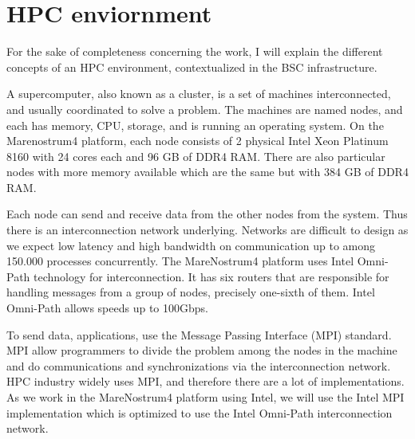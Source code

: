 \section{HPC enviornment}

For the sake of completeness concerning the work, I will explain the different concepts of an HPC environment, contextualized in the BSC infrastructure.

A supercomputer, also known as a cluster, is a set of machines interconnected, and usually coordinated to solve a problem. The machines are named nodes, and each has memory, CPU, storage, and is running an operating system.  On the Marenostrum4 platform, each node consists of 2 physical Intel Xeon Platinum 8160 with 24 cores each and 96 GB of DDR4 RAM. There are also particular nodes with more memory available which are the same but with 384 GB of DDR4 RAM.
 
Each node can send and receive data from the other nodes from the system. Thus there is an interconnection network underlying. Networks are difficult to design as we expect low latency and high bandwidth on communication up to among 150.000 processes concurrently. The MareNostrum4 platform uses Intel Omni-Path technology for interconnection. It has six routers that are responsible for handling messages from a group of nodes, precisely one-sixth of them. Intel Omni-Path allows speeds up to 100Gbps.

To send data, applications, use the Message Passing Interface (MPI) standard. MPI allow programmers to divide the problem among the nodes in the machine and do communications and synchronizations via the interconnection network. HPC industry widely uses MPI, and therefore there are a lot of implementations. As we work in the MareNostrum4 platform using Intel, we will use the Intel MPI implementation which is optimized to use the Intel Omni-Path interconnection network.



